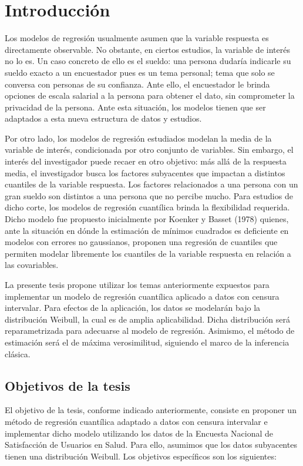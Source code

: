 \chapter{Introducción}

Los modelos de regresión usualmente asumen que la variable respuesta es directamente observable. No obstante, en ciertos estudios, la variable de interés no lo es. Un caso concreto de ello es el sueldo: una persona dudaría indicarle su sueldo exacto a un encuestador pues es un tema personal; tema que solo se conversa con personas de su confianza. Ante ello, el encuestador le brinda opciones de escala salarial a la persona para obtener el dato, sin comprometer la privacidad de la persona. Ante esta situación, los modelos tienen que ser adaptados a esta nueva estructura de datos y estudios.

Por otro lado, los modelos de regresión estudiados modelan la media de la variable de interés, condicionada por otro conjunto de variables. Sin embargo, el interés del investigador puede recaer en otro objetivo: más allá de la respuesta media, el investigador busca los factores subyacentes que impactan a distintos cuantiles de la variable respuesta. Los factores relacionados a una persona con un gran sueldo son distintos a una persona que no percibe mucho. Para estudios de dicho corte, los modelos de regresión cuantílica brinda la flexibilidad requerida. Dicho modelo fue propuesto inicialmente por Koenker y Basset (1978) quienes, ante la situación en dónde la estimación de mínimos cuadrados es deficiente en modelos con errores no gaussianos, proponen una regresión de cuantiles que permiten modelar libremente los cuantiles de la variable respuesta en relación a las covariables.

La presente tesis propone utilizar los temas anteriormente expuestos para implementar un modelo de regresión cuantílica aplicado a datos con censura intervalar. Para efectos de la aplicación, los datos se modelarán bajo la distribución Weibull, la cual es de amplia aplicabilidad. Dicha distribución será reparametrizada para adecuarse al modelo de regresión. Asimismo, el método de estimación será el de máxima verosimilitud,  siguiendo el marco de la inferencia clásica.

\section{Objetivos de la tesis}
El objetivo de la tesis, conforme indicado anteriormente, consiste en proponer un método de regresión cuantílica adaptado a datos con censura intervalar e implementar dicho modelo utilizando los datos de la Encuesta Nacional de Satisfacción de Usuarios en Salud. Para ello, asumimos que los datos subyacentes tienen una distribución Weibull. Los objetivos específicos son los siguientes:

